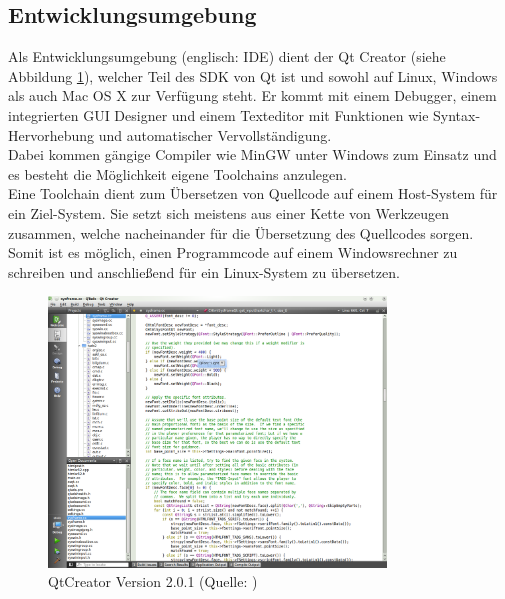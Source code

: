 \subsection{Entwicklungsumgebung}
Als Entwicklungsumgebung (englisch: \ac{IDE}) dient der Qt Creator (siehe Abbildung \ref{QtCreator}), welcher Teil des \ac{SDK} von Qt ist und sowohl auf Linux, Windows als auch Mac OS X zur Verfügung steht. Er kommt mit einem Debugger, einem integrierten \ac{GUI} Designer und einem Texteditor mit Funktionen wie Syntax-Hervorhebung und automatischer Vervollständigung. \\
Dabei kommen gängige Compiler wie MinGW unter Windows zum Einsatz und es besteht die Möglichkeit eigene Toolchains anzulegen. \\
Eine Toolchain dient zum Übersetzen von Quellcode auf einem Host-System für ein Ziel-System. Sie setzt sich meistens aus einer Kette von Werkzeugen zusammen, welche nacheinander für die Übersetzung des Quellcodes sorgen. Somit ist es möglich, einen Programmcode auf einem Windowsrechner zu schreiben und anschließend für ein Linux-System zu übersetzen.

\begin{figure}[H]
\begin{center}
\includegraphics[width=0.8\textwidth]{img/general/QtCreator.png}
\caption{QtCreator Version 2.0.1 (Quelle: \protect\cite{qtcreator})}
\label{QtCreator}
\end{center}
\end{figure}



